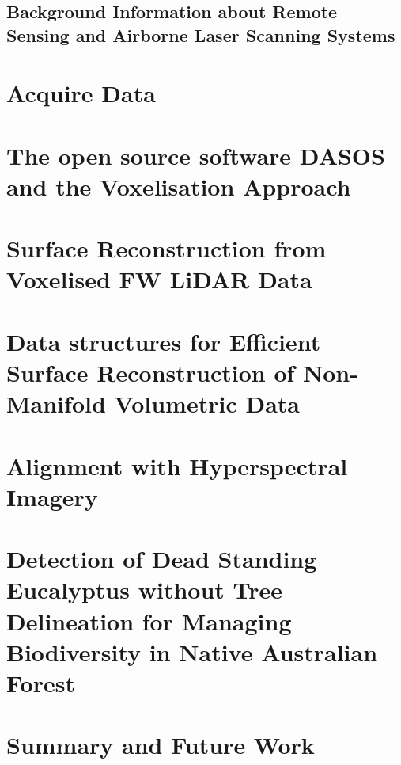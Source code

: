 \documentclass[11pt,nofootinbib]{report}
\begin{document}
		\section{Background Information about Remote Sensing and Airborne Laser Scanning Systems}\label{Background}
			
			\newpage
			
		
    \chapter{Acquire Data}\label{AcquireData}
		 
	    \newpage

	\chapter{The open source software DASOS and the Voxelisation Approach}\label{DASOS_Voxelisation}
			
	\newpage


		 		
	\chapter{Surface Reconstruction from Voxelised FW LiDAR Data}\label{Visualisations}
		

		\newpage
    \chapter{Data structures for Efficient Surface Reconstruction of Non-Manifold Volumetric Data}\label{Optimisations}
      
			 \newpage
	\chapter{Alignment with Hyperspectral Imagery}\label{Alignment}
		
		\newpage		
	\chapter{Detection of Dead Standing Eucalyptus without Tree Delineation for Managing Biodiversity in Native Australian Forest}\label{Classifications}
		
		\newpage
	\chapter{Summary and Future Work}\label{Conclusions}
		
		\newpage
		
\end{document}
